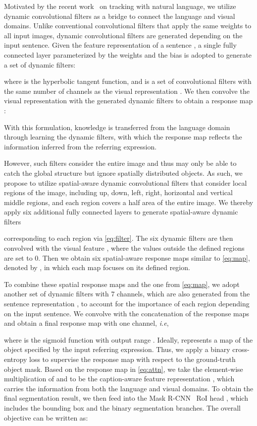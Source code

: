 \documentclass{bmvc2k}
\def\ie{\emph{i.e}\bmvaOneDot}
\begin{document}
{}
Motivated by the recent work~\cite{Li_CVPR_2017} on tracking with natural language, we utilize dynamic convolutional filters as a bridge to connect the language and visual domains.
Unlike conventional convolutional filters that apply the same weights to all input images, dynamic convolutional filters are generated depending on the input sentence.
Given the feature representation  of a sentence , a single fully connected layer parameterized by the weights  and the bias  is adopted to generate a set of dynamic filters:

where  is the hyperbolic tangent function, and  is a set of  convolutional filters with the same number of channels as the visual representation . 
We then convolve the visual representation  with the generated dynamic filters  to obtain a response map :

With this formulation, knowledge is transferred from the language domain through learning the dynamic filters, with which the response map reflects the information inferred from the referring expression.


However, such filters consider the entire image and thus may only be able to catch the global structure but ignore spatially distributed objects.
As such, we propose to utilize spatial-aware dynamic convolutional filters that consider local regions of the image, including up, down, left, right, horizontal and vertical middle regions, and each region covers a half area of the entire image.
We thereby apply six additional fully connected layers to generate spatial-aware dynamic filters 

corresponding to each region  via \eqref{eq:filter}. The six dynamic filters are then convolved with the visual feature , where the values outside the defined regions are set to 0. Then we obtain six spatial-aware response maps similar to \eqref{eq:map}, denoted by , in which each map focuses on its defined region.


To combine these spatial response maps and the one from \eqref{eq:map}, we adopt another set of dynamic filters  with 7 channels, which are also generated from the sentence representation , to account for the importance of each region depending on the input sentence.
We convolve  with the concatenation of the  response maps  and obtain a final response map  with one channel, \ie,

where  is the sigmoid function with output range .
Ideally,  represents a map of the object specified by the input referring expression.
Thus, we apply a binary cross-entropy loss  to supervise the response map  with respect to the ground-truth object mask.
{}
Based on the response map in \eqref{eq:attn}, we take the element-wise multiplication of  and  to be the caption-aware feature representation , which carries the information from both the language and visual domains.
To obtain the final segmentation result, we then feed  into the Mask R-CNN~\cite{He_ICCV_2017} RoI head , which includes the bounding box and the binary segmentation branches. The overall objective can be written as:
\end{document}
